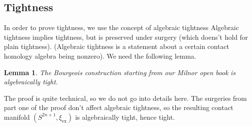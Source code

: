 \documentclass{amsart}
\newtheorem{lemma}{Lemma}
\newtheorem{definition}{Definition}
\begin{document}
\subsection*{Tightness}

In order to prove tightness, we use the concept of algebraic tightness
Algebraic tightness implies tightness, but is preserved under surgery (which doens't hold for plain tightness).
(Algebraic tightness is a statement about a certain contact homology algebra being nonzero).
We need the following lemma.
\begin{lemma}
    The Bourgeois construction starting from our Milnor open book
    is algebraically tight.
\end{lemma}
The proof is quite technical, so we do not go into details here.
The surgeries from part one of the proof don't affect algebraic tightness, so the resulting
contact manifold $(S^{2n+1}, \xi_\mathrm{ex})$ is algebraically tight, hence tight.

\end{document}
